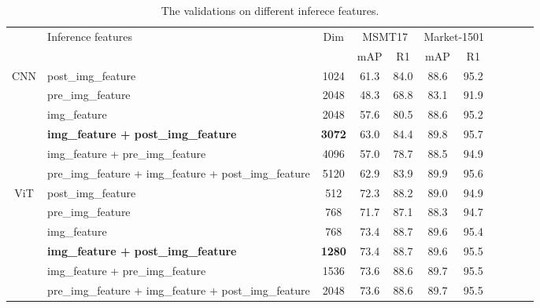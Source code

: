 \documentclass[letterpaper]{article} \usepackage{aaai23}  \usepackage{times}  \usepackage{helvet}  \usepackage{courier}  \usepackage[hyphens]{url}  \usepackage{graphicx} \urlstyle{rm} \def\UrlFont{\rm}  \usepackage{natbib}  \usepackage{caption} \frenchspacing  \setlength{\pdfpagewidth}{8.5in}  \setlength{\pdfpageheight}{11in}  \usepackage{algorithm}
\begin{document}
\begin{table*}[]
\centering
\begin{tabular}{c|l|c|cccccccc}
\hline
\rm



\multirow{2}{*}{Backbone} & \multirow{2}{*}{Inference features}  & \multirow{2}{*}{Dim} & \multicolumn{2}{c}{MSMT17} & \multicolumn{2}{c}{Market-1501} \\




\multicolumn{1}{c|}{} & \multicolumn{1}{c|}{} & \multicolumn{1}{c|}{} & \multicolumn{1}{c}{mAP} & \multicolumn{1}{c}{R1} & \multicolumn{1}{c}{mAP} & \multicolumn{1}{c}{R1} \\ \hline
\multirow{6}{*}{CNN} 
 & post\_img\_feature & 1024 & 61.3 & 84.0 & 88.6 & 95.2\\ 
 & pre\_img\_feature & 2048 & 48.3 & 68.8 & 83.1 & 91.9\\ 
 & img\_feature & 2048 & 57.6 & 80.5 & 88.6 & 95.2\\ 
 & \textbf{img\_feature + post\_img\_feature} & \textbf{3072} & 63.0 & 84.4 & 89.8 & 95.7 \\ 
 & img\_feature + pre\_img\_feature & 4096 & 57.0 & 78.7 & 88.5 & 94.9\\
 & pre\_img\_feature + img\_feature + post\_img\_feature & 5120 & 62.9 & 83.9 & 89.9 & 95.6\\ \hline
\multirow{6}{*}{ViT} 
 & post\_img\_feature & 512 & 72.3 & 88.2 & 89.0 & 94.9\\ 
 & pre\_img\_feature & 768 & 71.7 & 87.1 & 88.3 & 94.7\\
 & img\_feature & 768 & 73.4 & 88.7 & 89.6 & 95.4\\ 
 & \textbf{img\_feature + post\_img\_feature} & \textbf{1280} & 73.4 & 88.7 & 89.6 & 95.5 \\ 
 & img\_feature + pre\_img\_feature & 1536 & 73.6 & 88.6 & 89.7 & 95.5\\
 & pre\_img\_feature + img\_feature + post\_img\_feature & 2048 & 73.6 & 88.6 & 89.7 & 95.5\\ \hline
\end{tabular}
\caption{The validations on different inferece features.}
\label{tab:inference}
\end{table*}
\end{document}

